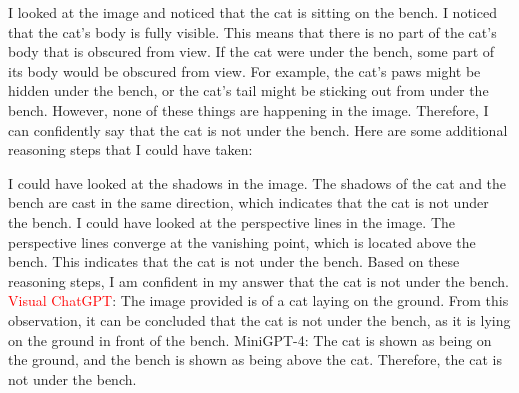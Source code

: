 \begin{enumerate}
        I looked at the image and noticed that the cat is sitting on the bench.
        I noticed that the cat's body is fully visible. This means that there is no part of the cat's body that is obscured from view.
        If the cat were under the bench, some part of its body would be obscured from view. For example, the cat's paws might be hidden under the bench, or the cat's tail might be sticking out from under the bench. However, none of these things are happening in the image.
        Therefore, I can confidently say that the cat is not under the bench.
        Here are some additional reasoning steps that I could have taken:
        
        I could have looked at the shadows in the image. The shadows of the cat and the bench are cast in the same direction, which indicates that the cat is not under the bench.
        I could have looked at the perspective lines in the image. The perspective lines converge at the vanishing point, which is located above the bench. This indicates that the cat is not under the bench.
        Based on these reasoning steps, I am confident in my answer that the cat is not under the bench.
        \subitem \textcolor{red}{Visual ChatGPT}: The image provided is of a cat laying on the ground. From this observation, it can be concluded that the cat is not under the bench, as it is lying on the ground in front of the bench.
        \subitem MiniGPT-4: The cat is shown as being on the ground, and the bench is shown as being above the cat. Therefore, the cat is not under the bench.
    \end{enumerate}
